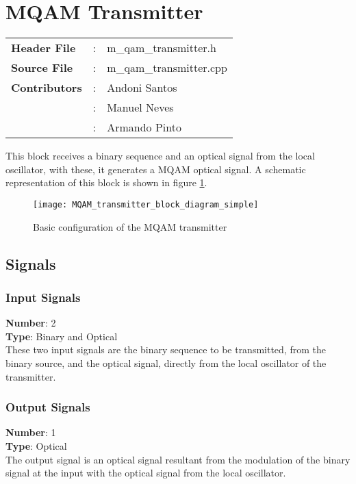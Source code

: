 \clearpage
\graphicspath{{./lib/m_qam_transmitter/figures/}}
\section{MQAM Transmitter}

\begin{tcolorbox}	
	\begin{tabular}{p{2.75cm} p{0.2cm} p{10.5cm}} 	
		\textbf{Header File}   &:& m\_qam\_transmitter.h \\
		\textbf{Source File}   &:& m\_qam\_transmitter.cpp \\
        \textbf{Contributors}  &:& Andoni Santos\\
				               &:& Manuel Neves\\
                               &:& Armando Pinto\\ 
	\end{tabular}
\end{tcolorbox}

This block receives a binary sequence and an optical signal from the local oscillator, with these, it generates a MQAM optical signal. A schematic representation of this block is shown in figure \ref{MQAM_transmitter_block_diagram_simple}.

\begin{figure}[h]
	\centering
	\texttt{[image: MQAM\_transmitter\_block\_diagram\_simple]}
	\caption{Basic configuration of the MQAM transmitter}\label{MQAM_transmitter_block_diagram_simple}
\end{figure}

\subsection*{Signals}
\subsubsection*{Input Signals}
\hspace*{0.5in}\textbf{Number}: 2\\
\hspace*{0.5in}\textbf{Type}: Binary and Optical
\\
These two input signals are the binary sequence to be transmitted, from the binary source, and the optical signal, directly from the local oscillator of the transmitter.

\subsubsection*{Output Signals}
\hspace*{0.5in}\textbf{Number}: 1\\
\hspace*{0.5in}\textbf{Type}: Optical
\\
The output signal is an optical signal resultant from the modulation of the binary signal at the input with the optical signal from the local oscillator.


